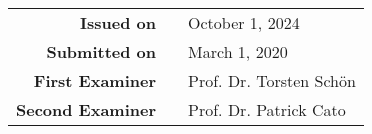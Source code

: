 \begin{titlepage}
\begin{center}
\begin{tabular}{r@{:}ll}
			\textbf{Issued on}	& & October 1, 2024	\\ [1em] %
			\textbf{Submitted on}	& & March 1, 2020	\\ [3em] %
			
			\textbf{First Examiner} &	& Prof. Dr. Torsten Schön	\\ [1em]
			\textbf{Second Examiner} 	& & Prof. Dr. Patrick Cato	\\[3em]
			
		\end{tabular}
	\end{center}
	
\end{titlepage}

\restoregeometry